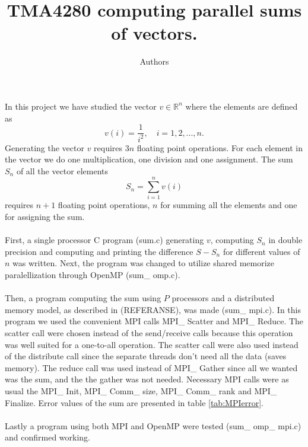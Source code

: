\documentclass{article}
\title{TMA4280 computing parallel sums of vectors.}
\author{Authors}
\begin{document}
\maketitle
In this project we have studied the vector $v \in \mathbb{R}^n$ where the elements are defined as 
\begin{equation}
\label{vdefinition}
	v(i) =\frac{1}{i^2},\quad i = 1,2,...,n.
\end{equation}
Generating the vector $v$ requires $3n$ floating point operations. For each element in the vector we do one multiplication, one division and one assignment.  
The sum $S_n$ of all the vector elements 
\begin{equation}
\label{Sdefinition}
	S_n = \sum_{i=1}^n v(i)
\end{equation}
requires $n+1$ floating point operations, $n$ for summing all the elements and one for assigning the sum.\\
\\
First, a single processor C program (sum.c) generating $v$, computing $S_n$ in double precision and computing and printing the difference $S - S_n$ for different values of $n$ was written. Next, the program was changed to utilize shared memorize paralellization through OpenMP (sum\_ omp.c). \\
\\
Then, a program computing the sum using $P$ processors and a distributed memory model, as described in (REFERANSE), was made (sum\_ mpi.c). In this program we used the convenient MPI calls MPI\_ Scatter and MPI\_ Reduce. The scatter call were chosen instead of the send/receive calls because this operation was well suited for a one-to-all operation. The scatter call were also used instead of the distribute call since the separate threads don't need all the data (saves memory). The reduce call was used instead of MPI\_ Gather since all we wanted was the sum, and the the gather was not needed. Necessary MPI calls were as usual the MPI\_ Init, MPI\_ Comm\_ size, MPI\_ Comm\_ rank and MPI\_ Finalize. Error values of the sum are presented in table \ref{tab:MPIerror}.\\
\\
Lastly a program using both MPI and OpenMP were tested (sum\_ omp\_ mpi.c) and confirmed working.
\end{document}
